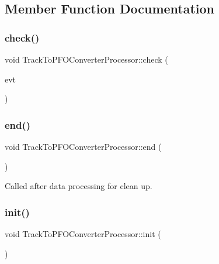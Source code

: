 \subsection{Member Function Documentation}
\mbox{\label{classTrackToPFOConverterProcessor_af305254181eb5aebee00b0cae8800a84}} 
\subsubsection{check()}
{\footnotesize\ttfamily void Track\+To\+P\+F\+O\+Converter\+Processor\+::check (\begin{DoxyParamCaption}\item[{L\+C\+Event $\ast$}]{evt }\end{DoxyParamCaption})\hspace{0.3cm}{\ttfamily [virtual]}}

\mbox{\label{classTrackToPFOConverterProcessor_acfa14fec4553eb62133998b1b519c4e9}} 
\subsubsection{end()}
{\footnotesize\ttfamily void Track\+To\+P\+F\+O\+Converter\+Processor\+::end (\begin{DoxyParamCaption}{ }\end{DoxyParamCaption})\hspace{0.3cm}{\ttfamily [virtual]}}



Called after data processing for clean up. 

\mbox{\label{classTrackToPFOConverterProcessor_a3db6b8b8983070e501c669856b1e2472}} 
\subsubsection{init()}
{\footnotesize\ttfamily void Track\+To\+P\+F\+O\+Converter\+Processor\+::init (\begin{DoxyParamCaption}{ }\end{DoxyParamCaption})\hspace{0.3cm}{\ttfamily [virtual]}}



